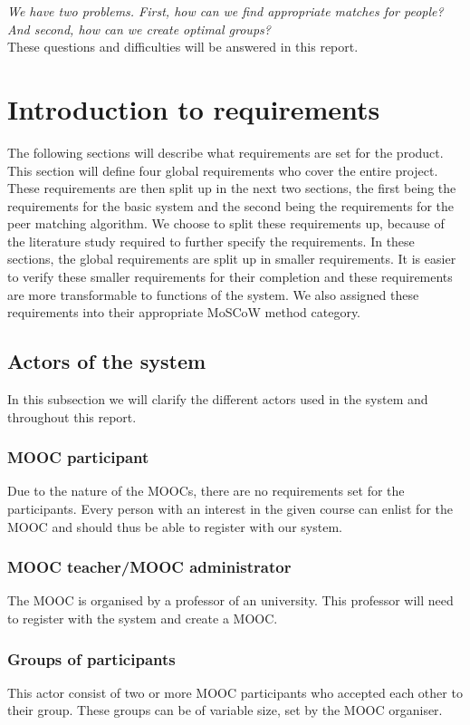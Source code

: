 \emph{We have two problems. First, how can we find appropriate matches for people? And second, how can we create optimal groups?}\\

These questions and difficulties will be answered in this report.

\section*{Introduction to requirements}
The following sections will describe what requirements are set for the product.
This section will define four global requirements who cover the entire project.
These requirements are then split up in the next two sections, the first being the requirements for the basic system and the second being the requirements for the peer matching algorithm.
We choose to split these requirements up, because of the literature study required to further specify the requirements.
In these sections, the global requirements are split up in smaller requirements.
It is easier to verify these smaller requirements for their completion and these requirements are more transformable to functions of the system.
We also assigned these requirements into their appropriate MoSCoW \cite{highsmith2001agile} method category.

\subsection*{Actors of the system}
In this subsection we will clarify the different actors used in the system and throughout this report.
\subsubsection*{MOOC participant}
Due to the nature of the MOOCs, there are no requirements set for the participants.
Every person with an interest in the given course can enlist for the MOOC and should thus be able to register with our system.
\subsubsection*{MOOC teacher/MOOC administrator} 
The MOOC is organised by a professor of an university.
This professor will need to register with the system and create a MOOC.
\subsubsection*{Groups of participants}
This actor consist of two or more MOOC participants who accepted each other to their group.
These groups can be of variable size, set by the MOOC organiser.

